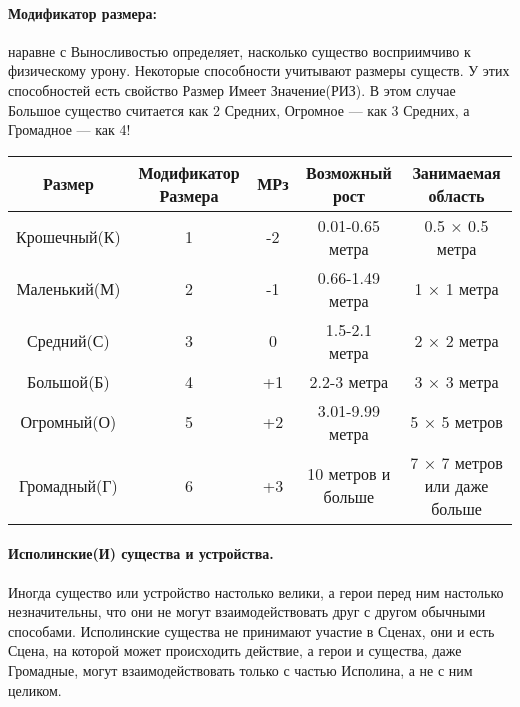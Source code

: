 \paragraph{Модификатор размера:} наравне с Выносливостью определяет, насколько существо восприимчиво к физическому урону. Некоторые способности учитывают размеры существ. У этих способностей есть свойство Размер Имеет Значение(РИЗ). В этом случае Большое существо считается как 2 Средних, Огромное — как 3 Средних, а Громадное — как 4!
\begin{center}
\begin{tabular}{ |c|c|c|c|c| }
\hline
Размер & Модификатор Размера & МРз & Возможный рост & Занимаемая область
\\ \hline
Крошечный(К) & 1 & -2 & 0.01-0.65 метра & 0.5 × 0.5 метра
\\ \hline
Маленький(М) & 2 & -1 & 0.66-1.49 метра & 1 × 1 метра
\\ \hline
Средний(С) & 3 & 0 & 1.5-2.1 метра & 2 × 2 метра
\\ \hline
Большой(Б) & 4 & +1 & 2.2-3 метра & 3 × 3 метра
\\ \hline
Огромный(О) & 5 & +2 & 3.01-9.99 метра & 5 × 5 метров
\\ \hline
Громадный(Г) & 6 & +3 & 10 метров и больше & 7 × 7 метров или даже больше
\\ \hline
\end{tabular}
\end{center}
\paragraph{Исполинские(И) существа и устройства.} Иногда существо или устройство настолько велики, а герои перед ним настолько незначительны, что они не могут взаимодействовать друг с другом обычными способами. Исполинские существа не принимают участие в Сценах, они и есть Сцена, на которой может происходить действие, а герои и существа, даже Громадные, могут взаимодействовать только с частью Исполина, а не с ним целиком.